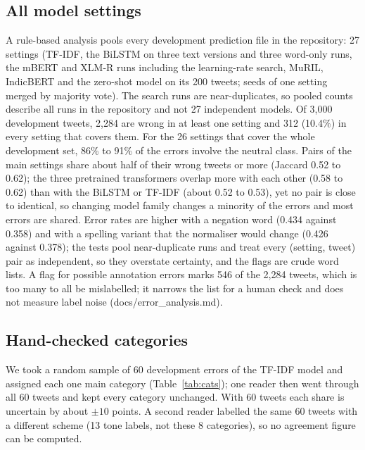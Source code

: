 \documentclass{nle}
\begin{document}
\subsection{All model settings}
A rule-based analysis pools every development prediction file in the repository: 27 settings (TF-IDF, the BiLSTM on three text
versions and three word-only runs, the mBERT and XLM-R runs including the learning-rate search, MuRIL, IndicBERT and the zero-shot
model on its 200 tweets; seeds of one setting merged by majority vote). The search runs are near-duplicates, so pooled counts
describe all runs in the repository and not 27 independent models. Of 3{,}000 development tweets, 2{,}284 are wrong in at least one
setting and 312 (10.4\%) in every setting that covers them. For the 26 settings that cover the whole development set, 86\% to
91\% of the errors involve the neutral class. Pairs of the main settings share about half of their wrong tweets or more (Jaccard
0.52 to 0.62); the three pretrained transformers overlap more with each other (0.58 to 0.62) than with the BiLSTM or TF-IDF (about
0.52 to 0.53), yet no pair is close to identical, so changing model family changes a minority of the errors and most errors are
shared. Error rates are higher with a negation word (0.434 against 0.358) and with a spelling variant that the normaliser would
change (0.426 against 0.378); the tests pool near-duplicate runs and treat every (setting, tweet) pair as independent, so they
overstate certainty, and the flags are crude word lists. A flag for possible annotation errors marks 546 of the 2{,}284 tweets,
which is too many to all be mislabelled; it narrows the list for a human check and does not measure label noise
(docs/error\_analysis.md).

\subsection{Hand-checked categories}
We took a random sample of 60 development errors of the TF-IDF model and assigned each one main category (Table~\ref{tab:cats}); one reader then went through all 60 tweets and kept every category unchanged. With 60 tweets each share is uncertain by about $\pm10$ points. A second reader labelled the same 60 tweets with a different scheme (13 tone labels, not these 8 categories), so no agreement figure can be computed.
\end{document}
